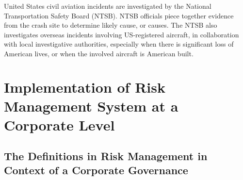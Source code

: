 \documentclass[a4paper, 10pt]{article}
\begin{document}
United States civil aviation incidents are investigated by the National Transportation Safety Board (NTSB). NTSB officials piece together evidence from the crash site to determine likely cause, or causes. The NTSB also investigates overseas incidents involving US-registered aircraft, in collaboration with local investigative authorities, especially when there is significant loss of American lives, or when the involved aircraft is American built.\par
\section{Implementation of Risk Management System at a Corporate Level}
\subsection{The Definitions in Risk Management in Context of a Corporate Governance}%
\end{document}
